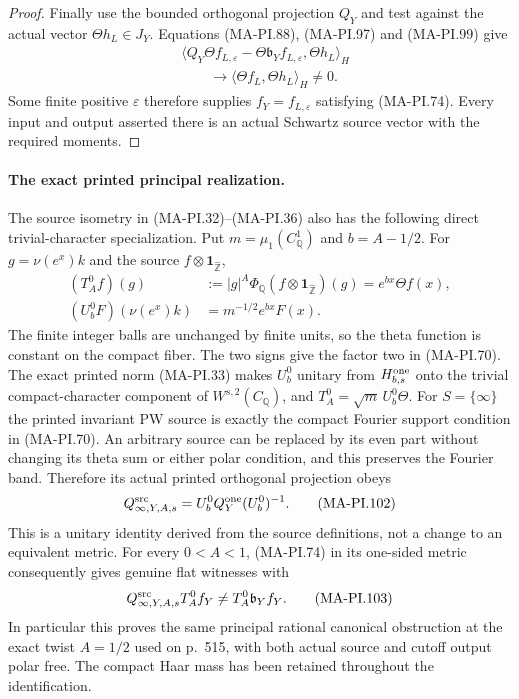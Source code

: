 \begin{proof}
Finally use the bounded orthogonal projection $Q_Y$
and test against the actual vector $\Theta h_L\in J_Y$.
Equations (MA-PI.88), (MA-PI.97) and (MA-PI.99) give
\[
 \begin{split}
 &\langle Q_Y\Theta f_{L,\varepsilon}
            -\Theta\mathfrak b_Y f_{L,\varepsilon},\Theta h_L\rangle_H\\
 &\qquad\longrightarrow
                       \langle\Theta f_L,\Theta h_L\rangle_H\ne0.
 \end{split}
 \tag{MA-PI.100}
\]
Some finite positive $\varepsilon$ therefore supplies
$f_Y=f_{L,\varepsilon}$ satisfying (MA-PI.74).
Every input and output asserted there is an actual
Schwartz source vector with the required moments.
\end{proof}

\paragraph{The exact printed principal realization.}
The source isometry in (MA-PI.32)--(MA-PI.36) also has
the following direct trivial-character specialization.
Put $m=\mu_1(C_{\mathbb Q}^1)$ and $b=A-1/2$. For
$g=\nu(e^x)k$ and the source $f\otimes\mathbf1_{\widehat{\mathbb Z}}$,
\[
 \begin{aligned}
 (T_A^0f)(g)
   &:=|g|^A\Phi_{\mathbb Q}
                   (f\otimes\mathbf1_{\widehat{\mathbb Z}})(g)
       =e^{bx}\Theta f(x),\\
 (U_b^0F)(\nu(e^x)k)&=m^{-1/2}e^{bx}F(x).
 \end{aligned}
 \tag{MA-PI.101}
\]
The finite integer balls are unchanged by finite units,
so the theta function is constant on the compact fiber.
The two signs give the factor two in (MA-PI.70).
The exact printed norm (MA-PI.33) makes $U_b^0$ unitary
from $H^{\rm one}_{b,s}$ onto the trivial compact-character
component of $W^{s,2}(C_{\mathbb Q})$, and
$T_A^0=\sqrt m\,U_b^0\Theta$.
For $S=\{\infty\}$ the printed invariant PW source is
exactly the compact Fourier support condition in
(MA-PI.70). An arbitrary source can be replaced by its
even part without changing its theta sum or either
polar condition, and this preserves the Fourier band.
Therefore its actual printed orthogonal projection obeys
\[
 Q^{\rm src}_{\infty,Y,A,s}
                       =U_b^0Q_Y^{\rm one}(U_b^0)^{-1}.
 \tag{MA-PI.102}
\]
This is a unitary identity derived from the source
definitions, not a change to an equivalent metric.
For every $0<A<1$, (MA-PI.74) in its one-sided metric
consequently gives genuine flat witnesses with
\[
 Q^{\rm src}_{\infty,Y,A,s}T_A^0f_Y
                       \ne T_A^0\mathfrak b_Yf_Y.
 \tag{MA-PI.103}
\]
In particular this proves the same principal rational
canonical obstruction at the exact twist $A=1/2$
used on p.~515, with both actual source and cutoff
output polar free. The compact Haar mass has been
retained throughout the identification.

